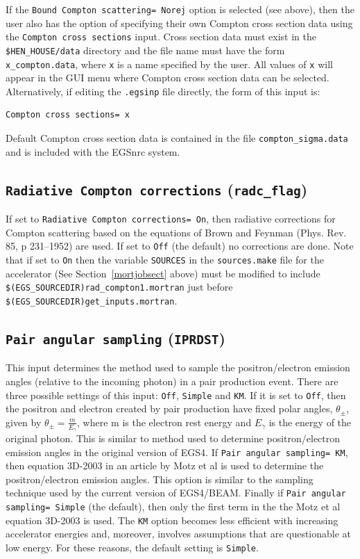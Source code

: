 \documentclass[12pt,twoside]{article}
\begin{document}
If the {\tt Bound Compton scattering= Norej} option is selected (see above), then
the user also has the option of
specifying their own Compton cross section data
using the {\tt Compton cross sections} input.  Cross section data must exist
in the {\tt \$HEN\_HOUSE/data} directory and the file name must have
the form {\tt x\_compton.data}, where {\tt x} is a name
specified by the user.  All values of {\tt x} will appear in the GUI menu where Compton
cross section data can be selected.  Alternatively, if editing
the {\tt .egsinp} file directly, the form of this input is:
\begin{verbatim}
Compton cross sections= x
\end{verbatim}
Default Compton cross section
data is contained in the file {\tt compton\_sigma.data} and is included with
the EGSnrc system.

\subsection{{\tt Radiative Compton corrections} ({\tt radc\_flag})}

If set to {\tt Radiative Compton corrections= On}, then radiative
corrections for Compton scattering based on the equations
of Brown and Feynman (Phys. Rev. 85, p 231--1952) are used.
If set to {\tt Off} (the default) no corrections are done.
Note that if set to {\tt On} then the variable {\tt SOURCES} in
the {\tt sources.make} file for the accelerator (See Section~\ref{mortjobsect} above)
must be modified to include {\tt \$(EGS\_SOURCEDIR)rad\_compton1.mortran} just
before {\tt \$(EGS\_SOURCEDIR)get\_inputs.mortran}.

\subsection{ {\tt Pair angular sampling} ({\tt IPRDST})}

This input determines the method used to sample the positron/electron emission
angles (relative to the incoming photon) in a pair production event.  There
are three possible settings of this input: {\tt Off}, {\tt Simple} and {\tt KM}.
If it is set to {\tt Off}, then the positron and electron created by pair
production have fixed polar angles, $\theta_{\pm}$, given by
$\theta_{\pm}=\frac{m}{E_{\gamma}}$, where m is the electron rest energy
and $E_{\gamma}$
 is the energy of the original photon.  This is similar to method used to determine
positron/electron emission angles in the original version of EGS4.
If {\tt Pair angular sampling= KM}, then equation 3D-2003 in an article
by Motz et al\cite{Mo69} is used to determine the positron/electron emission
angles.  This option is similar to the sampling technique used by the current
version of EGS4/BEAM.  Finally if {\tt Pair angular sampling= Simple} (the default), then only
the first term in the the Motz et al equation 3D-2003 is used.  The {\tt KM} option
becomes less efficient with increasing accelerator energies and, moreover, involves
assumptions that are questionable at low energy.  For these reasons, the default
setting is {\tt Simple}.
\end{document}
